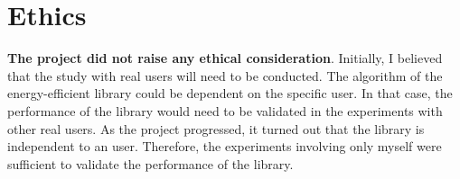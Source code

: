 \section{Ethics}
\label{s:ethics}

\textbf{The project did not raise any ethical consideration}. Initially, I believed that the study with real users will need to be conducted. The algorithm of the energy-efficient library could be dependent on the specific user. In that case, the performance of the library would need to be validated in the experiments with other real users. As the project progressed, it turned out that the library is independent to an user. Therefore, the experiments involving only myself were sufficient to validate the performance of the library.  